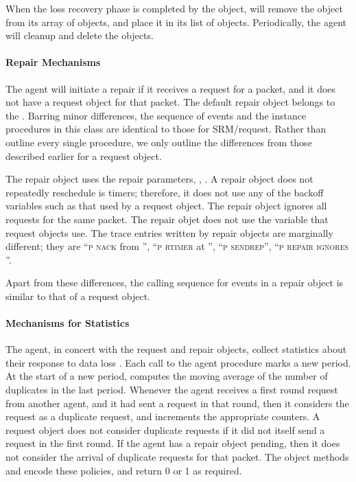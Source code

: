 When the loss recovery phase is completed by the object,
will remove the object from its array of  objects,
and place it in its list of  objects.
Periodically, the agent will cleanup and delete the  objects.

\paragraph{Repair Mechanisms}
The agent will initiate a repair if it receives a request for a packet,
and it does not have a request object  for that packet.
The default repair object belongs to the
.
Barring minor differences,
the sequence of events and the instance procedures in this class
are identical to those for SRM/request.
Rather than outline every single procedure, we only outline
the differences from those described earlier for a request object.

The repair object uses the repair parameters, , .
A repair object does not repeatedly reschedule is timers;
therefore, it does not use any of the backoff variables
such as that used by a request object.
The repair object ignores all requests for the same packet.
The repair objet does not use the  variable that
request objects use.
The trace entries written by repair objects are marginally different;
they are ``\textsc{p nack } from '',
``\textsc{p rtimer } at '',
``\textsc{p sendrep}'', ``\textsc{p repair ignores } ''.

Apart from these differences,
the calling sequence for events in a repair object is similar to that
of a request object.

\paragraph{Mechanisms for Statistics}
The agent, in concert with the request and repair objects, 
collect statistics about their response to data loss \cite{Floy95:Reliable}.
Each call to the agent  procedure marks a new period.
At the start of a new period,
computes the moving average of the number of duplicates in the last period.
Whenever the agent receives a first round request from another agent,
and it had sent a request in that round, then it considers the request
as a duplicate request, and increments the appropriate counters.
A request object does not consider duplicate requests if it did not
itself send a request in the first round. 
If the agent has a repair object pending, then it does not consider
the arrival of duplicate requests for that packet.
The object methods
 and
encode these policies, and return 0 or 1 as required.

